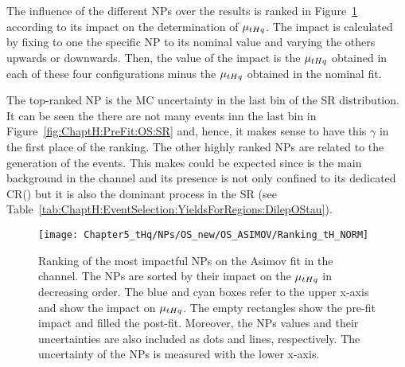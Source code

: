 The influence of the different NPs over the results is ranked in Figure~\ref{fig:ChaptH:Asimov:OS:Ranking} according to its
 impact on the determination of $\mu_{tHq}$.  
 The impact is calculated by fixing to one 
 the specific NP to its nominal value and varying the others upwards or downwards.
 Then, the value of the impact is the $\mu_{tHq}$  obtained in each of these four configurations minus the $\mu_{tHq}$  
 obtained in the nominal fit.   
 
 The top-ranked NP is the MC uncertainty in the last bin of the SR distribution. 
 It can be seen the there are not many events inn the last bin in Figure~\ref{fig:ChaptH:PreFit:OS:SR} 
 and, hence, it makes sense to have this $\gamma$ in the first place of the ranking.
 The other highly ranked NPs are related to the generation of the \ttbar events.
 This makes could be expected since \ttbar is the main background in the \dilepOStau
 channel and its presence is not only confined to its dedicated CR(\ttbar) but it
 is also the dominant process in the SR (see Table~\ref{tab:ChaptH:EventSelection:YieldsForRegions:DilepOStau}).
  

\begin{figure}[h]%
    \centering
        \texttt{[image: Chapter5\_tHq/NPs/OS\_new/OS\_ASIMOV/Ranking\_tH\_NORM]}
    \caption{Ranking of the most impactful NPs on the Asimov fit in the \dilepOStau channel. 
    The NPs are sorted by their impact on the $\mu_{tHq}$ in decreasing order. 
    The blue and cyan boxes refer to the upper x-axis and show the impact on $\mu_{tHq}$.
    The empty rectangles show the pre-fit impact and filled the post-fit. 
    Moreover, the NPs values and their uncertainties are also included as dots and 
    lines, respectively. The uncertainty of the NPs is measured with the lower x-axis.}
    \label{fig:ChaptH:Asimov:OS:Ranking}
\end{figure}


